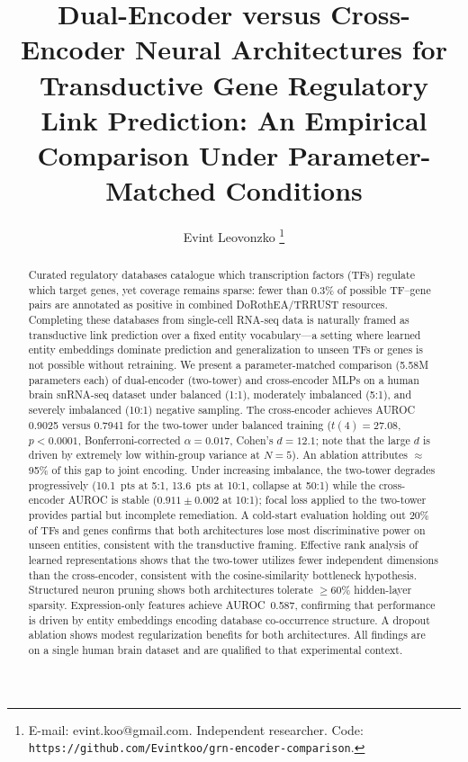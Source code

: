 \documentclass[journal]{IEEEtran}
\begin{document}
\title{Dual-Encoder versus Cross-Encoder Neural Architectures for Transductive
Gene Regulatory Link Prediction: An Empirical Comparison Under Parameter-Matched
Conditions}

\author{Evint Leovonzko%
\thanks{E-mail: evint.koo@gmail.com. Independent researcher.
Code: \texttt{https://github.com/Evintkoo/grn-encoder-comparison}.}}

\maketitle

\begin{abstract}
Curated regulatory databases catalogue which transcription factors (TFs)
regulate which target genes, yet coverage remains sparse: fewer than 0.3\% of
possible TF--gene pairs are annotated as positive in combined DoRothEA/TRRUST
resources. Completing these databases from single-cell RNA-seq data is
naturally framed as transductive link prediction over a fixed entity
vocabulary---a setting where learned entity embeddings dominate prediction and
generalization to unseen TFs or genes is not possible without retraining.
We present a parameter-matched comparison (5.58M parameters each) of
dual-encoder (two-tower) and cross-encoder MLPs on a human brain snRNA-seq
dataset under balanced (1:1), moderately imbalanced (5:1), and severely
imbalanced (10:1) negative sampling. The cross-encoder achieves AUROC 0.9025
versus 0.7941 for the two-tower under balanced training ($t(4){=}27.08$,
$p{<}0.0001$, Bonferroni-corrected $\alpha{=}0.017$, Cohen's $d{=}12.1$;
note that the large $d$ is driven by extremely low within-group variance at
$N{=}5$). An ablation attributes $\approx$95\% of this gap to joint encoding.
Under increasing imbalance, the two-tower degrades progressively (10.1~pts at
5:1, 13.6~pts at 10:1, collapse at 50:1) while the cross-encoder AUROC is
stable ($0.911 \pm 0.002$ at 10:1); focal loss applied to the two-tower
provides partial but incomplete remediation. A cold-start evaluation
holding out 20\% of TFs and genes confirms that both architectures lose most
discriminative power on unseen entities, consistent with the transductive
framing. Effective rank analysis of learned representations shows that the
two-tower utilizes fewer independent dimensions than the cross-encoder,
consistent with the cosine-similarity bottleneck hypothesis.
Structured neuron pruning shows both architectures tolerate $\geq$60\%
hidden-layer sparsity. Expression-only features achieve AUROC~0.587,
confirming that performance is driven by entity embeddings encoding database
co-occurrence structure. A dropout ablation shows modest regularization
benefits for both architectures. All findings are on a single human brain
dataset and are qualified to that experimental context.
\end{abstract}
\end{document}
